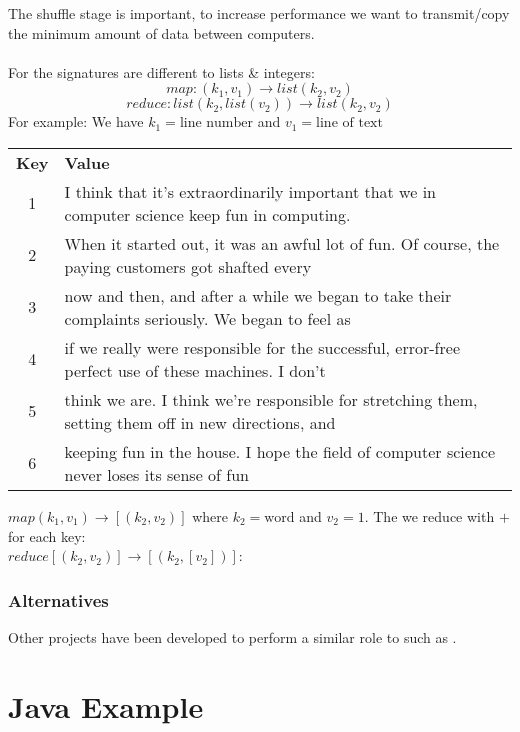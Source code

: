 \documentclass{report}
\begin{document}
The shuffle stage is important, to increase performance we want to transmit/copy the minimum amount of data between computers.
\\
\\ For  the signatures are different to lists \& integers:
\[map: (k_1,v_1) \to list(k_2, v_2)\]
\[reduce: list(k_2, list(v_2)) \to list(k_2, v_2)\]
For example:
We have $k_1 = \text{line number}$ and $v_1 = \text{line of text}$
\begin{center}
	\begin{tabular}{c l}
		\textbf{Key} & \textbf{Value}                                                                                       \\
		1            & I think that it's extraordinarily important that we in computer science keep fun in computing.       \\
		2            & When it started out, it was an awful lot of fun. Of course, the paying customers got shafted every   \\
		3            & now and then, and after a while we began to take their complaints seriously. We began to feel as     \\
		4            & if we really were responsible for the successful, error-free perfect use of these machines. I don't  \\
		5            & think we are. I think we're responsible for stretching them, setting them off in new directions, and \\
		6            & keeping fun in the house. I hope the field of computer science never loses its sense of fun          \\
	\end{tabular}
\end{center}
$map (k_1, v_1) \to [(k_2, v_2)]$ where $k_2 = \text{word}$ and $v_2 = \text{1}$.
The we reduce with $+$ for each key:
\\ $reduce [(k_2, v_2)] \to [(k_2, [v_2])]$:

\subsubsection*{Alternatives}
Other projects have been developed to perform a similar role to  such as .

\section*{Java Example}
\end{document}
